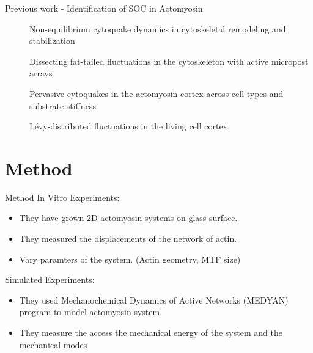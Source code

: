 \documentclass[aspectratio=169]{beamer}
\begin{document}
    \begin{frame}{Previous work - Identification of SOC in Actomyosin}
        \begin{description}
            \item[\cite{alencarNonequilibriumCytoquakeDynamics2016}] {Non-equilibrium cytoquake dynamics in cytoskeletal remodeling and stabilization} 
            \item[\cite{shiDissectingFattailedFluctuations2019}] {Dissecting fat-tailed fluctuations in the cytoskeleton with active micropost arrays }
            \item[\cite{yuBalanceForceGeneration2018}] {Pervasive cytoquakes in the actomyosin cortex across cell types and substrate stiffness }
            \item[\cite{sivarajanLevydistributedFluctuationsLiving2024}] {L\'{e}vy-distributed fluctuations in the living cell cortex.}
        \end{description}
    \end{frame}
  
    \section{Method}
    \begin{frame}{Method}
        In Vitro Experiments:
        \begin{itemize}
            \item [-] They have grown 2D actomyosin systems on glass surface.
            \item [-] They measured the displacements of the network of actin.
            \item [-] Vary paramters of the system. (Actin geometry, MTF size)
        \end{itemize}
        Simulated Experiments:
        \begin{itemize}
            \item [-] They used Mechanochemical Dynamics of Active Networks (MEDYAN) program to model actomyosin system.
            \item [-] They measure the access the mechanical energy of the system and the mechanical modes
        \end{itemize}
    \end{frame}
\end{document}

